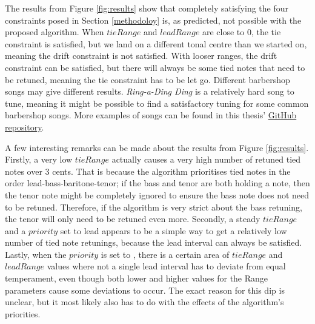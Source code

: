 \documentclass[a4paper]{article}
\begin{document}
The results from Figure \ref{fig:results} show that completely satisfying the four constraints posed in Section \ref{methodoloy} is, as predicted, not possible with the proposed algorithm. When $\mathit{tieRange}$ and $\mathit{leadRange}$ are close to 0, the tie constraint is satisfied, but we land on a different tonal centre than we started on, meaning the drift constraint is not satisfied. With looser ranges, the drift constraint can be satisfied, but there will always be some tied notes that need to be retuned, meaning the tie constraint has to be let go. Different barbershop songs may give different results. \textit{Ring-a-Ding Ding} is a relatively hard song to tune, meaning it might be possible to find a satisfactory tuning for some common barbershop songs. More examples of songs can be found in this thesis' \href{https://github.com/teuncb/adaptivebarbershop}{GitHub repository}.

A few interesting remarks can be made about the results from Figure \ref{fig:results}. Firstly, a very low $\mathit{tieRange}$ actually causes a very high number of retuned tied notes over 3 cents. That is because the algorithm prioritises tied notes in the order lead-bass-baritone-tenor; if the bass and tenor are both holding a note, then the tenor note might be completely ignored to ensure the bass note does not need to be retuned. Therefore, if the algorithm is very strict about the bass retuning, the tenor will only need to be retuned even more. Secondly, a steady $\mathit{tieRange}$ and a $\mathit{priority}$ set to lead appears to be a simple way to get a relatively low number of tied note retunings, because the lead interval can always be satisfied. Lastly, when the $\mathit{priority}$ is set to , there is a certain area of $\mathit{tieRange}$ and $\mathit{leadRange}$ values where not a single lead interval has to deviate from equal temperament, even though both lower and higher values for the Range parameters cause some deviations to occur. The exact reason for this dip is unclear, but it most likely also has to do with the effects of the algorithm's priorities.

\end{document}
